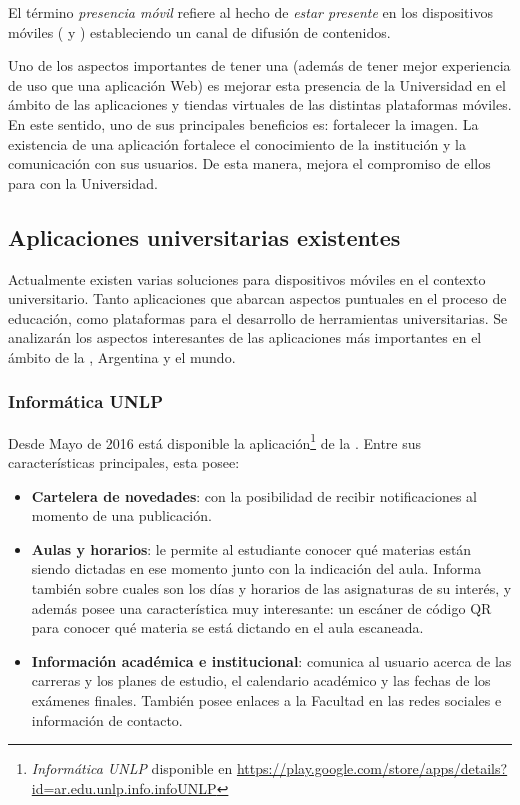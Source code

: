 El término \textit{presencia móvil} refiere al hecho de \textit{estar presente} en los dispositivos móviles ( y ) estableciendo un  canal de difusión de contenidos\cite{presenciaMovilDef}.

Uno de los aspectos importantes de tener una  (además de tener mejor experiencia de uso que una aplicación Web) es mejorar esta presencia de la Universidad  en el ámbito de las aplicaciones y tiendas virtuales de las distintas plataformas móviles. En este sentido, uno de sus principales beneficios es: fortalecer la imagen. La existencia de una aplicación fortalece el conocimiento de la institución y la comunicación con sus usuarios. De esta manera, mejora el compromiso de ellos para con la Universidad\cite{presenciaMovil}.

\subsection{Aplicaciones universitarias existentes}
\label{aplicaciones_universitarias_existentes}

Actualmente existen varias soluciones para dispositivos móviles en el contexto
universitario. Tanto aplicaciones que abarcan aspectos puntuales en el proceso
de educación, como plataformas para el desarrollo de herramientas
universitarias. Se analizarán los aspectos interesantes de las aplicaciones más
importantes en el ámbito de la \unlp, Argentina y el mundo.


\subsubsection{Informática UNLP}
\label{aplicaciones_existentes_unlp_informatica}


Desde Mayo de 2016 está disponible la aplicación\footnote{ \textit{Informática UNLP} disponible en \url{https://play.google.com/store/apps/details?id=ar.edu.unlp.info.infoUNLP} } de la \facultad. Entre sus características principales, esta posee:
\begin{itemize}
\item \textbf{Cartelera de novedades}: con la posibilidad de recibir notificaciones al momento de una publicación.
\item \textbf{Aulas y horarios}: le permite al estudiante conocer qué materias están siendo dictadas en ese momento junto con la indicación del aula. Informa también sobre cuales son los días y horarios de las asignaturas de su interés, y además posee una característica muy interesante: un escáner de código QR para conocer qué materia se está dictando en el aula escaneada.
\item \textbf{Información académica e institucional}: comunica al usuario acerca de las carreras y los planes de estudio, el calendario académico y las fechas de los exámenes finales. También posee enlaces a la Facultad en las redes sociales e información de contacto.
\end{itemize}


